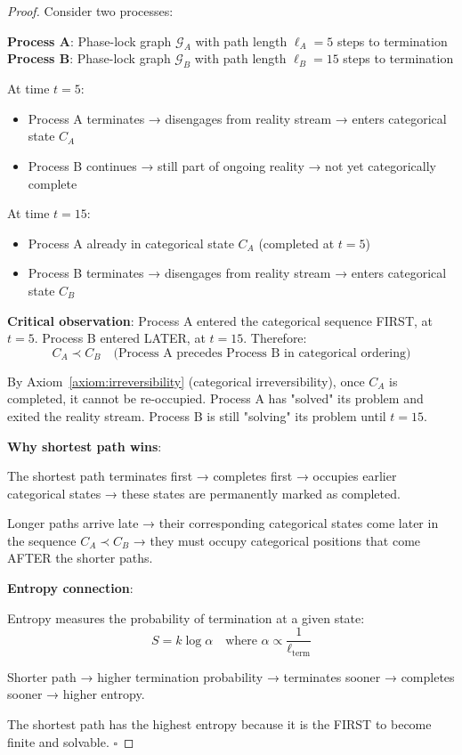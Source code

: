 \documentclass[12pt,a4paper]{article}
\theoremstyle{remark}
\begin{document}
\begin{proof}
Consider two processes:

\textbf{Process A}: Phase-lock graph $\mathcal{G}_A$ with path length $\ell_A = 5$ steps to termination
\textbf{Process B}: Phase-lock graph $\mathcal{G}_B$ with path length $\ell_B = 15$ steps to termination

At time $t = 5$:
\begin{itemize}
\item Process A terminates → disengages from reality stream → enters categorical state $C_A$
\item Process B continues → still part of ongoing reality → not yet categorically complete
\end{itemize}

At time $t = 15$:
\begin{itemize}
\item Process A already in categorical state $C_A$ (completed at $t=5$)
\item Process B terminates → disengages from reality stream → enters categorical state $C_B$
\end{itemize}

\textbf{Critical observation}: Process A entered the categorical sequence FIRST, at $t=5$. Process B entered LATER, at $t=15$. Therefore:
\begin{equation}
C_A \prec C_B \quad \text{(Process A precedes Process B in categorical ordering)}
\end{equation}

By Axiom~\ref{axiom:irreversibility} (categorical irreversibility), once $C_A$ is completed, it cannot be re-occupied. Process A has "solved" its problem and exited the reality stream. Process B is still "solving" its problem until $t=15$.

\textbf{Why shortest path wins}:

The shortest path terminates first → completes first → occupies earlier categorical states → these states are permanently marked as completed.

Longer paths arrive late → their corresponding categorical states come later in the sequence $C_A \prec C_B$ → they must occupy categorical positions that come AFTER the shorter paths.

\textbf{Entropy connection}:

Entropy measures the probability of termination at a given state:
\begin{equation}
S = k \log \alpha \quad \text{where } \alpha \propto \frac{1}{\ell_{\text{term}}}
\end{equation}

Shorter path → higher termination probability → terminates sooner → completes sooner → higher entropy.

The shortest path has the highest entropy because it is the FIRST to become finite and solvable. $\square$
\end{proof}
\end{document}
